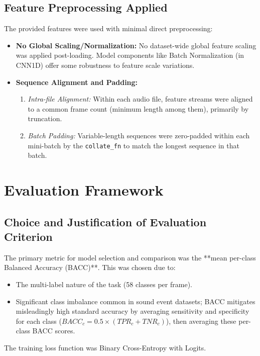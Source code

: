 \documentclass[11pt, a4paper]{article}
\newcommand{\code}[1]{\texttt{#1}}
\begin{document}
\subsection{Feature Preprocessing Applied}
The provided features were used with minimal direct preprocessing:
\begin{itemize}
    \item \textbf{No Global Scaling/Normalization:} No dataset-wide global feature scaling was applied post-loading. Model components like Batch Normalization (in CNN1D) offer some robustness to feature scale variations.
    \item \textbf{Sequence Alignment and Padding:}
    \begin{enumerate}[label=(\roman*)]
        \item \textit{Intra-file Alignment:} Within each audio file, feature streams were aligned to a common frame count (minimum length among them), primarily by truncation.
        \item \textit{Batch Padding:} Variable-length sequences were zero-padded within each mini-batch by the \code{collate\_fn} to match the longest sequence in that batch.
    \end{enumerate}
\end{itemize}

\section{Evaluation Framework}
\label{sec:evaluation_framework}

\subsection{Choice and Justification of Evaluation Criterion}
The primary metric for model selection and comparison was the **mean per-class Balanced Accuracy (BACC)**. This was chosen due to:
\begin{itemize}
    \item The multi-label nature of the task (58 classes per frame).
    \item Significant class imbalance common in sound event datasets; BACC mitigates misleadingly high standard accuracy by averaging sensitivity and specificity for each class ($BACC_c = 0.5 \times (TPR_c + TNR_c)$), then averaging these per-class BACC scores.
\end{itemize}
The training loss function was Binary Cross-Entropy with Logits.
\end{document}
